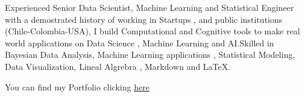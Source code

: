 

\begin{cvparagraph}

Experienced Senior Data Scientist, Machine Learning and Statistical Engineer with a demostrated history of working in Startups , and public institutions (Chile-Colombia-USA), I build Computational and Cognitive tools to make real world applications on Data Science , Machine Learning and AI.Skilled in Bayesian Data Analysis, Machine Learning applications , Statistical Modeling, Data Visualization, Lineal Algrebra , Markdown and LaTeX. 

You can find my Portfolio clicking \textcolor{red}{\href{https://github.com/carlosjimenez88M/Portfolio/blob/gh-pages/index.md}{here}}
\end{cvparagraph}
